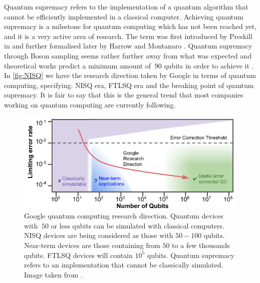 

Quantum supremacy refers to the implementation of a quantum algorithm that cannot be efficiently implemented in a classical computer. Achieving quantum supremacy is a milestone for quantum computing which has not been reached yet, and it is a very active area of research. The term was first introduced by Preskill in \cite{Preskill2012} and further formalised later by Harrow and Montanaro \cite{HarrowMontanaro2017}. Quantum supremacy through Boson sampling seems rather further away from what was expected \cite{QAdvantage} and theoretical works predict a minimum amount of $~90$ qubits in order to achieve it \cite{Harrow2018}. In \autoref{fig:NISQ} we have the research direction taken by Google in terms of quantum computing, specifying: NISQ era, FTLSQ era and the breaking point of quantum supremacy. It is fair to say that this is the general trend that most companies working on quantum computing are currently following.

\begin{figure}[h!]
    \centering
    \includegraphics[scale=0.6]{figures/NISQ.png}
    \caption{Google quantum computing research direction. Quantum devices with $~50$ or less qubits can be simulated with classical computers. NISQ devices are being considered as those with $50-100$ qubits. Near-term devices are those containing from $50$ to a few thousands qubits. FTLSQ devices will contain $10^5$ qubits. Quantum supremacy refers to an implementation that cannot be classically simulated. Image taken from \cite{NISQ}.}
    \label{fig:NISQ}
\end{figure}

